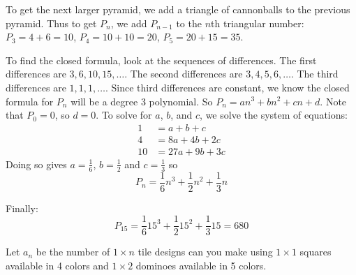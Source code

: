 \begin{questions}
\begin{solution}
  To get the next larger pyramid, we add a triangle of cannonballs to the previous pyramid.  Thus to get $P_n$, we add $P_{n-1}$ to the $n$th triangular number:
  $P_3 = 4 + 6 = 10$, $P_4 = 10 + 10 = 20$, $P_5 = 20 + 15 = 35$.

  	To find the closed formula, look at the sequences of differences.  The first differences are $3, 6, 10, 15, \ldots$.  The second differences are $3, 4, 5, 6, \ldots$.  The third differences are $1,1,1,\ldots$.  Since third differences are constant, we know the closed formula for $P_n$ will be a degree 3 polynomial.  So $P_n = an^3 + b n^2 + cn + d$.  Note that $P_0 = 0$, so $d = 0$.  To solve for $a$, $b$, and $c$, we solve the system of equations:
  \begin{align*}
    1 & = a + b + c \\
    4 & = 8a+ 4b + 2c \\
    10 & = 27a + 9b + 3c
  \end{align*}
  Doing so gives $a = \frac{1}{6}$, $b = \frac{1}{2}$ and $c = \frac{1}{3}$ so
  \[P_n = \frac{1}{6}n^3 + \frac{1}{2} n^2 + \frac{1}{3} n\]

Finally:
  \[P_{15} = \frac{1}{6}15^3 + \frac{1}{2} 15^2 + \frac{1}{3} 15 = 680\]
\end{solution}




\question Let $a_n$ be the number of  $1 \times n$ tile designs can you make using $1 \times 1$ squares available in 4 colors and $1 \times 2$ dominoes available in 5 colors.
\end{questions}
